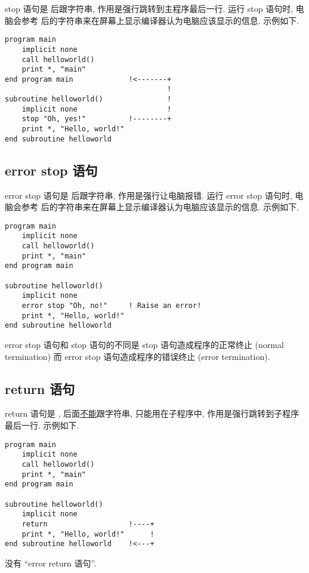 stop 语句是  后跟字符串, 作用是强行跳转到主程序最后一行. 运行 stop 语句时, 电脑会参考  后的字符串来在屏幕上显示编译器认为电脑应该显示的信息. 示例如下.
\begin{lstlisting}
program main
    implicit none
    call helloworld()
    print *, "main"
end program main             !<-------+
                                      !
subroutine helloworld()               !
    implicit none                     !
    stop "Oh, yes!"          !--------+
    print *, "Hello, world!"
end subroutine helloworld
\end{lstlisting}

\subsection{error stop 语句}

error stop 语句是  后跟字符串, 作用是强行让电脑报错. 运行 error stop 语句时, 电脑会参考  后的字符串来在屏幕上显示编译器认为电脑应该显示的信息. 示例如下.
\begin{lstlisting}
program main
    implicit none
    call helloworld()
    print *, "main"
end program main

subroutine helloworld()
    implicit none
    error stop "Oh, no!"     ! Raise an error!
    print *, "Hello, world!"
end subroutine helloworld
\end{lstlisting}
error stop 语句和 stop 语句的不同是 stop 语句造成程序的正常终止 (normal termination) 而 error stop 语句造成程序的错误终止 (error termination).

\subsection{return 语句}

return 语句是 , 后面\uline{不能}跟字符串, 只能用在子程序中, 作用是强行跳转到子程序最后一行. 示例如下.
\begin{lstlisting}
program main
    implicit none
    call helloworld()
    print *, "main"
end program main

subroutine helloworld()
    implicit none
    return                   !----+
    print *, "Hello, world!"      !
end subroutine helloworld    !<---+
\end{lstlisting}
没有 ``error return 语句''.
